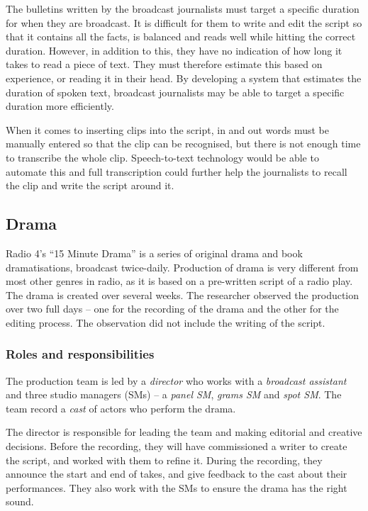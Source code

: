 The bulletins written by the broadcast journalists must target a specific duration for when they are broadcast. It is
difficult for them to write and edit the script so that it contains all the facts, is balanced and reads well while
hitting the correct duration. However, in addition to this, they have no indication of how long it takes to read a
piece of text. They must therefore estimate this based on experience, or reading it in their head.
By developing a system that estimates the duration of spoken text, broadcast journalists may be able to target a
specific duration more efficiently. 

When it comes to inserting clips into the script, in and out words must be manually entered so that the clip can be
recognised, but there is not enough time to transcribe the whole clip.  Speech-to-text technology would be able to
automate this and full transcription could further help the journalists to recall the clip and write the script around
it.

\subsection{Drama}\label{sec:drama}
Radio 4's ``15 Minute Drama'' is a series of original drama and book dramatisations, broadcast twice-daily. Production
of drama is very different from most other genres in radio, as it is based on a pre-written script of a radio play. The
drama is created over several weeks. The researcher observed the production over two full days -- one for the recording
of the drama and the other for the editing process.  The observation did not include the writing of the script.

\subsubsection{Roles and responsibilities}
The production team is led by a \textit{director} who works with a \textit{broadcast assistant} and three studio
managers (SMs) -- a \textit{panel SM}, \textit{grams SM} and \textit{spot SM}. The team record a \textit{cast} of
actors who perform the drama.

The director is responsible for leading the team and making editorial and creative decisions. Before the recording,
they will have commissioned a writer to create the script, and worked with them to refine it. During the recording,
they announce the start and end of takes, and give feedback to the cast about their performances.  They also work with
the SMs to ensure the drama has the right sound.

